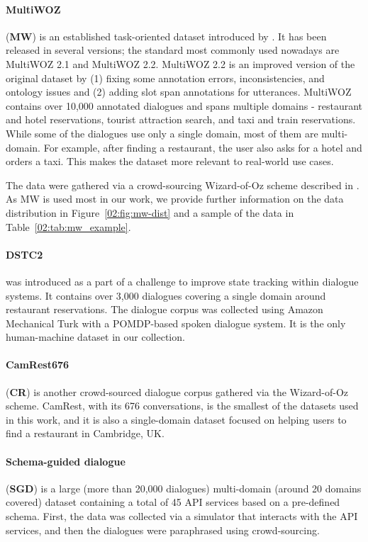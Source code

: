 \paragraph{MultiWOZ} (\textbf{MW}) is an established task-oriented dataset introduced by \cite{budzianowski-etal-2018-multiwoz}.
It has been released in several versions; the standard most commonly used nowadays are MultiWOZ 2.1 and MultiWOZ 2.2.
MultiWOZ 2.2 is an improved version of the original dataset by (1) fixing some annotation errors, inconsistencies, and ontology issues and (2) adding slot span annotations for utterances.
MultiWOZ contains over 10,000 annotated dialogues and spans multiple domains - restaurant and hotel reservations, tourist attraction search, and taxi and train reservations.
While some of the dialogues use only a single domain, most of them are multi-domain.
For example, after finding a restaurant, the user also asks for a hotel and orders a taxi.
This makes the dataset more relevant to real-world use cases.

The data were gathered via a crowd-sourcing Wizard-of-Oz scheme described in \cite{wen-etal-2017-wizard-of-oz}.
As MW is used most in our work, we provide further information on the data distribution in Figure~\ref{02:fig:mw-dist} and a sample of the data in Table~\ref{02:tab:mw_example}.

\paragraph{DSTC2} \cite{henderson_robust_2014} was introduced as a part of a challenge to improve state tracking within dialogue systems. It contains over 3,000 dialogues covering a single domain around restaurant reservations. The dialogue corpus was collected using Amazon Mechanical Turk with a POMDP-based spoken dialogue system. It is the only human-machine dataset in our collection.

\paragraph{CamRest676} (\textbf{CR}) \cite{wen2016network} is another crowd-sourced dialogue corpus gathered via the Wizard-of-Oz scheme. CamRest, with its 676 conversations, is the smallest of the datasets used in this work, and it is also a single-domain dataset focused on helping users to find a restaurant in Cambridge, UK. 

\paragraph{Schema-guided dialogue} (\textbf{SGD}) is a large (more than 20,000 dialogues) multi-domain (around 20 domains covered) dataset containing a total of 45 API services based on a pre-defined schema. First, the data was collected via a simulator that interacts with the API services, and then the dialogues were paraphrased using crowd-sourcing. \\

